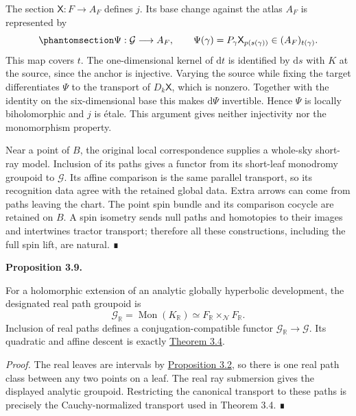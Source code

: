 \documentclass[
  english,
  11pt,
  reqno]{amsart}
\makeatletter
\newcommand{\pandocstatementheading}[1]{%
  \par\addpenalty{\@beginparpenalty}%
  \addvspace{.5\baselineskip plus .2\baselineskip minus .2\baselineskip}%
  {\normalfont\bfseries #1\par}%
  \nobreak\@afterindenttrue\@afterheading
}
\makeatother
\begin{document}
The section \(\mathsf X:F\to A_F\) defines \(j\). Its base change
against the atlas \(A_F\) is represented by
\begin{equation}\protect\phantomsection\label{eq:monodromy-affine-etale-base-change}{
\Psi:\mathcal G\longrightarrow A_F,
\qquad \Psi(\gamma)=P_\gamma\mathsf X_{p(s(\gamma))}
\in(A_F)_{t(\gamma)}.
}\end{equation} This map covers \(t\). The one-dimensional kernel of
\(\mathrm dt\) is identified by \(\mathrm ds\) with \(K\) at the source,
since the anchor is injective. Varying the source while fixing the
target differentiates \(\Psi\) to the transport of \(D_k\mathsf X\),
which is nonzero. Together with the identity on the six-dimensional base
this makes \(\mathrm d\Psi\) invertible. Hence \(\Psi\) is locally
biholomorphic and \(j\) is étale. This argument gives neither
injectivity nor the monomorphism property.

Near a point of \(B\), the original local correspondence supplies a
whole-sky short-ray model. Inclusion of its paths gives a functor from
its short-leaf monodromy groupoid to \(\mathcal G\). Its affine
comparison is the same parallel transport, so its recognition data agree
with the retained global data. Extra arrows can come from paths leaving
the chart. The point spin bundle and its comparison cocycle are retained
on \(B\). A spin isometry sends null paths and homotopies to their
images and intertwines tractor transport; therefore all these
constructions, including the full spin lift, are natural. ∎

\pandocstatementheading{\protect{}\label{prop:real-path-groupoid-v08}Proposition 3.9.}

For a holomorphic extension of an analytic globally hyperbolic
development, the designated real path groupoid is \[
\mathcal G_{\mathbb R}=\operatorname{Mon}(K_{\mathbb R})
\simeq F_{\mathbb R}\times_{\mathcal N}F_{\mathbb R}.
\] Inclusion of real paths defines a conjugation-compatible functor
\(\mathcal G_{\mathbb R}\to\mathcal G\). Its quadratic and affine
descent is exactly
\hyperref[thm:global-real-affine-ray-realization]{Theorem 3.4}.

\emph{Proof.} The real leaves are intervals by
\hyperref[prop:real-ray-cauchy-coordinates]{Proposition 3.2}, so there
is one real path class between any two points on a leaf. The real ray
submersion gives the displayed analytic groupoid. Restricting the
canonical transport to these paths is precisely the Cauchy-normalized
transport used in Theorem 3.4. ∎
\end{document}
